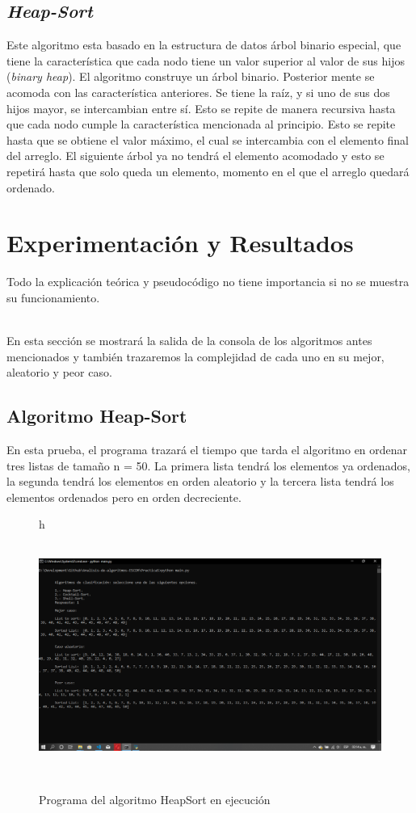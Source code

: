 \documentclass[12pt,twoside]{article}
\begin{document}
\subsection{\textit{Heap-Sort}}
Este algoritmo esta basado en la estructura de datos \'arbol binario especial, que tiene la caracter\'istica que cada nodo tiene un valor superior al valor de sus hijos (\textit{binary heap}). El algoritmo construye un \'arbol binario. Posterior mente se acomoda con las caracter\'istica anteriores. Se tiene la ra\'iz, y si uno de sus dos hijos mayor, se intercambian entre s\'i. Esto se repite de manera recursiva hasta que cada nodo cumple la caracter\'istica mencionada al principio. Esto se repite hasta que se obtiene el valor m\'aximo, el cual se intercambia con el elemento final del arreglo. El siguiente \'arbol ya no tendr\'a el elemento acomodado y esto se repetir\'a hasta que solo queda un elemento, momento en el que el arreglo quedar\'a ordenado.

\section{Experimentaci\'on y Resultados}
Todo la explicación te\'orica y pseudoc\'odigo no tiene importancia si no se muestra su funcionamiento.

\\En esta secci\'on se mostrará la salida de la consola de los algoritmos antes mencionados y tambi\'en trazaremos la complejidad de cada uno en su mejor, aleatorio y peor caso.

\subsection{Algoritmo Heap-Sort}
En esta prueba, el programa trazará el tiempo que tarda el algoritmo en ordenar tres listas de tamaño n = 50.
La primera lista tendrá los elementos ya ordenados, la segunda tendrá los elementos en orden aleatorio y la tercera lista tendr\'a los elementos ordenados pero en orden decreciente.

\begin{figure}{h}
    \centering
    \includegraphics[width=13cm, height=8cm]{HeapConsole.png}
    \caption{Programa del algoritmo HeapSort en ejecuci\'on}
    \label{fig:quick_program}
\end{figure}
\end{document}
